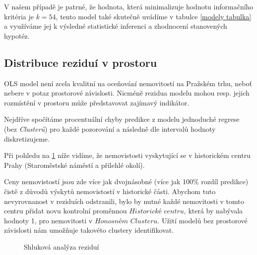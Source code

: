 \documentclass[11pt, a4paper]{article}
\begin{document}
\clearpage

V našem případě je patrné, že hodnota, která minimalizuje hodnotu informačního kritéria je \textit{$k = 54$}, tento model také skutečně uvádíme v tabulce \ref{modely tabulka} a využíváme jej k výsledné statistické inferenci a zhodnocení stanovených hypotéz.


\subsection{Distribuce reziduí v prostoru}

OLS model není zcela kvalitní na oceňování nemovitostí na Pražském trhu, neboť nebere v potaz prostorové závislosti. Nicméně rezidua modelu mohou resp. jejich rozmístění v prostoru může představovat zajímavý indikátor.


Nejdříve spočítáme procentuální chyby predikce z modelu jednoduché regrese (bez \textit{Clusterů}) pro každé pozorování a následně dle intervalů hodnoty diskretizujeme.

Při pohledu na \ref{Shluková analýza reziduí} níže vidíme, že nemovistosti vyskytující se v historickém centru Prahy (Staroměstské náměstí a přilehlé okolí).

Ceny nemovistostí jsou zde více jak dvojnásobné (více jak 100\% rozdíl predikce) čistě z důvodů výskytů nemovistostí v historické části. Abychom tuto nevyrovnanost v reziduích odstranili, bylo by nutné každé nemovitosti v tomto centru přidat novu kontrolní proměnnou $\textit{Historické centru}$, která by nabývala hodnoty 1, pro nemovitosti v $\textit{Honosném Clusteru}$. Užití modelů bez prostorové závislosti nám umožňuje takovéto clustery identifikovat.

\clearpage
\begin{figure}[ht]
    \centering
        \noindent{}
    \caption{Shluková analýza reziduí}
    \label{Shluková analýza reziduí}
\end{figure}
\end{document}
